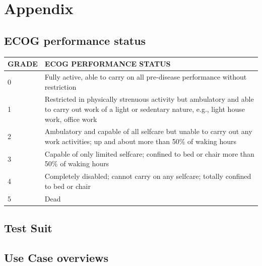 
\section{Appendix}

\subsection{ECOG performance status}


\begin{tabular}{|l p{8cm}|}
\hline
GRADE&	ECOG PERFORMANCE STATUS\\
\hline\hline
0	&Fully active, able to carry on all pre-disease performance without restriction\\
1	&Restricted in physically strenuous activity but ambulatory and able to carry out work of a light or sedentary nature, e.g., light house work, office work\\
2	&Ambulatory and capable of all selfcare but unable to carry out any work activities; up and about more than 50\% of waking hours\\
3	&Capable of only limited selfcare; confined to bed or chair more than 50\% of waking hours\\
4	&Completely disabled; cannot carry on any selfcare; totally confined to bed or chair\\
5	&Dead\\
\hline
\end{tabular}
\label{tab:ecog}

\subsection{Test Suit}
\label{sub:test_suit}


\subsection{Use Case overviews}


